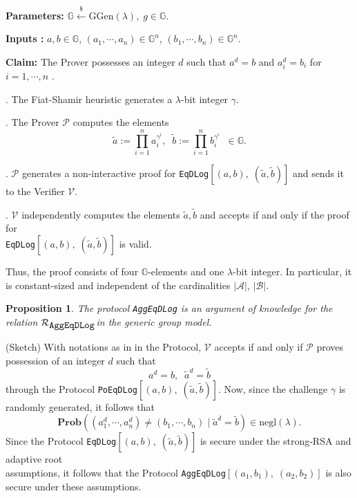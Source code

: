\documentclass[11pt, lettersize, notitlepage, leqno, footskip=0.6cm]{article}
\newcommand{\negl}{\mr{negl}}
\newcommand{\wti}{\widetilde}
\newcommand{\mc}{\mathcal}
\newcommand{\mb}{\mathbb}
\newcommand{\mbf}{\mathbf}
\newcommand{\mr}{\mathrm}
\newcommand{\lam}{\lambda}
\newcommand{\lamb}{\lambda}
\newcommand{\noin}{\noindent}
\newtheorem{Prop}[Thm]{Proposition}
\numberwithin{equation}{section}
\begin{document}
\noindent \textbf{Parameters:} $\mb{G}\xleftarrow{\$} \mr{GGen}(\lamb), \; g\in \mb{G}$.

\noindent \textbf{Inputs :} $a,b\in\mb{G}$, $(a_1, \cdots, a_n)\in\mb{G}^n$, $(b_1, \cdots, b_n)\in\mb{G}^n$.


\noindent \textbf{Claim:} The Prover possesses an integer $d$ such that $a^d = b$ and $a_i^d = b_i$ for $i = 1,\cdots, n$ .

\begin{prf1} . The Fiat-Shamir heuristic generates a $\lam$-bit integer $\gamma$.

. The Prover $\mc{P}$ computes the elements \vspace{-0.15cm}$$\wti{a}:= \prod\limits_{i=1}^n a_i^{\gamma^i}, \;\;\wti{b}:= \prod\limits_{i=1}^n b_i^{\gamma^i}\;\; \in \mb{G}.$$

. $\mc{P}$ generates a non-interactive proof for \verb|EqDLog|$[(a, b),\; (\wti{a}, \wti{b})]$ and sends it to the Verifier $\mc{V}$.

. $\mc{V}$ independently computes the elements $\wti{a}, \wti{b}$ and accepts if and only if the proof for\\ \verb|EqDLog|$[(a, b),\; (\wti{a}, \wti{b})]$ is valid.\end{prf1}
\vspace{0.1cm}

\noin Thus, the proof consists of four $\mb{G}$-elements and one  $\lam$-bit integer. In particular, it is constant-sized and independent of the cardinalities $|\mc{A}|$, $|\mc{B}|$.


\vspace{0.1cm}

\begin{Prop} The protocol \verb|AggEqDLog| is an argument of knowledge for the relation $\mc{R}_{{\protect\verb|AggEqDLog|}}$in the generic group
model.\end{Prop}

\begin{prf} (Sketch) With notations as in in the Protocol, $\mc{V}$ accepts if and only if $\mc{P}$ proves possession of an integer $d$ such that $$a^d = b,\;\;\wti{a}^d = \wti{b}$$ through the Protocol \verb|PoEqDLog|$[(a,b),\; (\wti{a},\wti{b})]$. Now, since the challenge $\gamma$ is randomly generated, it follows that \vspace{-0.15cm}$$ \mbf{Prob}\left( (a_1^d,\cdots, a_n^d) \neq (b_1,\cdots, b_n)\;   \Big|\; \wti{a}^d = \wti{b} \right) \in \negl(\lamb). $$ Since the Protocol \verb|EqDLog|$[(a,b),\; (\wti{a},\wti{b})]$ is secure under the strong-RSA and adaptive root\\ assumptions, it follows that the Protocol \verb|AggEqDLog|$[(a_1, b_1),\; (a_2, b_2)]$ is also secure under these assumptions.\end{prf}
\end{document}
